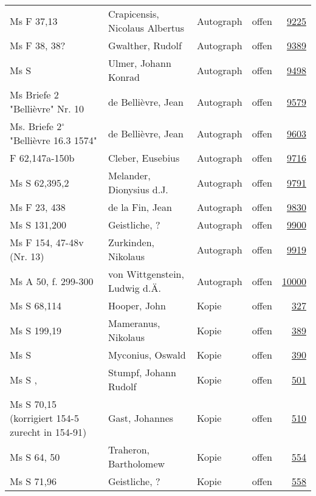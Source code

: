 \documentclass[10pt,a4paper,landscape]{report}
\begin{document}
\begin{longtable}{p{16cm}p{4cm}llr}
Ms F 37,13	&	Crapicensis, Nicolaus Albertus	&	Autograph	&	offen	&	\href{http://130.60.24.72/assignment/9225}{9225}\\
Ms F 38, 38?	&	Gwalther, Rudolf	&	Autograph	&	offen	&	\href{http://130.60.24.72/assignment/9389}{9389}\\
Ms S	&	Ulmer, Johann Konrad	&	Autograph	&	offen	&	\href{http://130.60.24.72/assignment/9498}{9498}\\
Ms Briefe 2 "Bellièvre" Nr. 10	&	de Bellièvre, Jean	&	Autograph	&	offen	&	\href{http://130.60.24.72/assignment/9579}{9579}\\
Ms. Briefe 2$^\circ$ "Bellièvre 16.3 1574"	&	de Bellièvre, Jean	&	Autograph	&	offen	&	\href{http://130.60.24.72/assignment/9603}{9603}\\
F 62,147a-150b	&	Cleber, Eusebius	&	Autograph	&	offen	&	\href{http://130.60.24.72/assignment/9716}{9716}\\
Ms S 62,395,2	&	Melander, Dionysius d.J.	&	Autograph	&	offen	&	\href{http://130.60.24.72/assignment/9791}{9791}\\
Ms F 23, 438	&	de la Fin, Jean	&	Autograph	&	offen	&	\href{http://130.60.24.72/assignment/9830}{9830}\\
Ms S 131,200	&	Geistliche, ?	&	Autograph	&	offen	&	\href{http://130.60.24.72/assignment/9900}{9900}\\
Ms F 154, 47-48v  (Nr. 13)	&	Zurkinden, Nikolaus	&	Autograph	&	offen	&	\href{http://130.60.24.72/assignment/9919}{9919}\\
Ms A 50, f. 299-300	&	von Wittgenstein, Ludwig d.Ä.	&	Autograph	&	offen	&	\href{http://130.60.24.72/assignment/10000}{10000}\\
Ms S 68,114	&	Hooper, John	&	Kopie	&	offen	&	\href{http://130.60.24.72/assignment/327}{327}\\
Ms S 199,19	&	Mameranus, Nikolaus	&	Kopie	&	offen	&	\href{http://130.60.24.72/assignment/389}{389}\\
Ms S	&	Myconius, Oswald	&	Kopie	&	offen	&	\href{http://130.60.24.72/assignment/390}{390}\\
Ms S ,	&	Stumpf, Johann Rudolf	&	Kopie	&	offen	&	\href{http://130.60.24.72/assignment/501}{501}\\
Ms S 70,15 (korrigiert 154-5 zurecht in 154-91)	&	Gast, Johannes	&	Kopie	&	offen	&	\href{http://130.60.24.72/assignment/510}{510}\\
Ms S 64, 50	&	Traheron, Bartholomew	&	Kopie	&	offen	&	\href{http://130.60.24.72/assignment/554}{554}\\
Ms S 71,96	&	Geistliche, ?	&	Kopie	&	offen	&	\href{http://130.60.24.72/assignment/558}{558}\\

\end{longtable}
\end{document}
